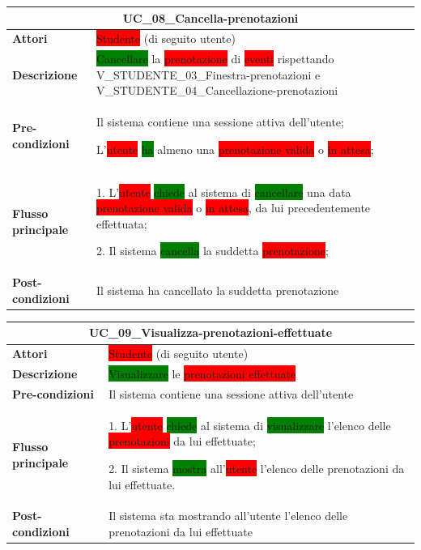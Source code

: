 \documentclass[11pt]{article}
\begin{document}
\begin{table}[H]
\centering
\begin{tabularx}{1\textwidth}{|l|X|}
\hline
\multicolumn{2}{|c|}{\textbf{UC\_08\_Cancella-prenotazioni}}\\
\hline \textbf{Attori} & \colorbox{red}{Studente} (di seguito utente)\\
\hline \textbf{Descrizione} & \colorbox{green}{Cancellare} la \colorbox{red}{prenotazione} di \colorbox{red}{eventi} rispettando V\_STUDENTE\_03\_Finestra-prenotazioni e V\_STUDENTE\_04\_Cancellazione-prenotazioni\\
\hline \textbf{Pre-condizioni} &
Il sistema contiene una sessione attiva dell'utente;

L'\colorbox{red}{utente} \colorbox{green}{ha} almeno una \colorbox{red}{prenotazione valida} o \colorbox{red}{in attesa}; 
\\
\hline \textbf{Flusso principale} &
1. L'\colorbox{red}{utente} \colorbox{green}{chiede} al sistema di \colorbox{green}{cancellare} una data \colorbox{red}{prenotazione valida} o \colorbox{red}{in attesa}, da lui precedentemente effettuata; 

2. Il sistema \colorbox{green}{cancella} la suddetta \colorbox{red}{prenotazione};
\\
\hline \textbf{Post-condizioni} & Il sistema ha cancellato la suddetta prenotazione\\
\hline
\end{tabularx}
\end{table}

\begin{table}[H]
\centering
\begin{tabularx}{1\textwidth}{|l|X|}
\hline
\multicolumn{2}{|c|}{\textbf{UC\_09\_Visualizza-prenotazioni-effettuate}}\\
\hline \textbf{Attori} & \colorbox{red}{Studente} (di seguito utente)\\
\hline \textbf{Descrizione} & \colorbox{green}{Visualizzare} le \colorbox{red}{prenotazioni effettuate}\\
\hline \textbf{Pre-condizioni} & Il sistema contiene una sessione attiva dell'utente\\
\hline \textbf{Flusso principale} & 
1. L'\colorbox{red}{utente} \colorbox{green}{chiede} al sistema di \colorbox{green}{visualizzare} l'elenco delle \colorbox{red}{prenotazioni} da lui effettuate;

2. Il sistema \colorbox{green}{mostra} all'\colorbox{red}{utente} l'elenco delle {prenotazioni} da lui effettuate.
\\
\hline \textbf{Post-condizioni} & Il sistema sta mostrando all'utente l'elenco delle prenotazioni da lui effettuate\\
\hline
\end{tabularx}
\end{table}
\end{document}
